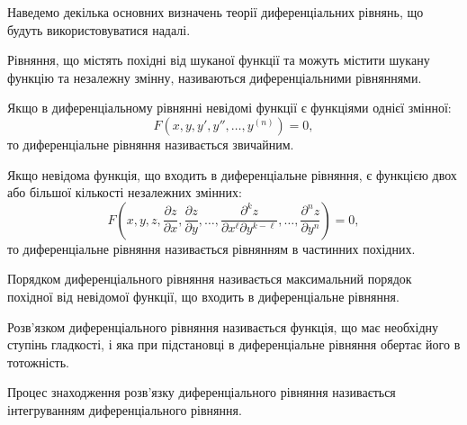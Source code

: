 Наведемо декілька основних визначень теорії диференціальних рівнянь, що будуть використовуватися надалі.

\begin{definition}
	Рівняння, що містять похідні від шуканої функції та можуть містити шукану функцію та незалежну змінну, називаються диференціальними рівняннями.
\end{definition}

\begin{definition}
	Якщо в диференціальному рівнянні невідомі функції є функціями однієї змінної:
	\begin{equation*}
		F \left( x, y, y', y'', \ldots, y^{(n)} \right) = 0,
	\end{equation*}
	то диференціальне рівняння називається звичайним.
\end{definition}

\begin{definition}
	Якщо невідома функція, що входить в диференціальне рівняння, є функцією двох або більшої кількості незалежних змінних:
	\begin{equation*}
		F \left( x, y, z, \frac{\partial z}{\partial x}, \frac{\partial z}{\partial y}, \ldots, \frac{\partial^k z}{\partial x^\ell \partial y^{k - \ell}}, \ldots, \frac{\partial^n z}{\partial y^n} \right) = 0,
	\end{equation*}
	то диференціальне рівняння називається рівнянням в частинних похідних.
\end{definition}

\begin{definition}
	Порядком диференціального рівняння називається максимальний порядок похідної від невідомої функції, що входить в диференціальне рівняння.
\end{definition}

\begin{definition}
	Розв'язком диференціального рівняння називається функція, що має необхідну ступінь гладкості, і яка при підстановці в диференціальне рівняння обертає його в тотожність. 
\end{definition}

\begin{definition}
	Процес знаходження розв'язку диференціального рівняння називається інтегруванням диференціального рівняння.
\end{definition}
